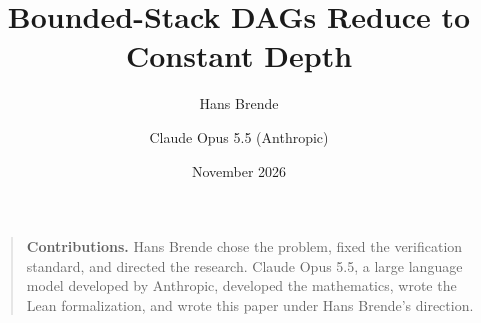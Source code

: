 \documentclass[11pt]{article}
\title{Bounded-Stack DAGs Reduce to Constant Depth}
\author{Hans Brende \and Claude Opus 5.5 (Anthropic)}
\date{November 2026}
\begin{document}
\maketitle

\begin{abstract}

\end{abstract}

\begin{quote}\small
\textbf{Contributions.} Hans Brende chose the problem, fixed the verification standard, and directed the research.
Claude Opus 5.5, a large language model developed by Anthropic, developed the mathematics, wrote the Lean
formalization, and wrote this paper under Hans Brende's direction.
\end{quote}

\tableofcontents
\clearpage












\appendix





\end{document}

